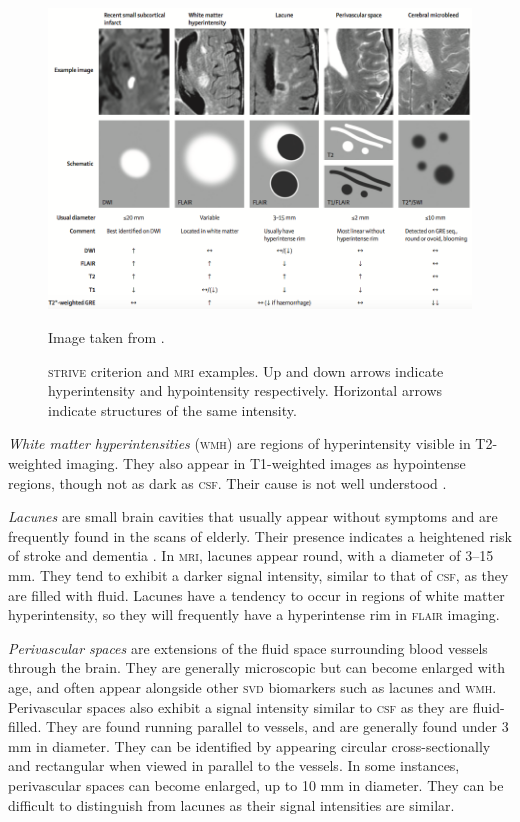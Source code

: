 \begin{figure}[ht]
	\centering
	\includegraphics[width = \textwidth]{Images/2_STRIVE.png}
	\caption{\textsc{strive} criterion and \textsc{mri} examples. Up and down arrows indicate hyperintensity and hypointensity respectively. Horizontal arrows indicate structures of the same intensity.}
	\small Image taken from \cite{WardlawJ.M.2013Nsfr}.
	\label{svd-biomarkers-fig}
\end{figure}

\textit{White matter hyperintensities} (\textsc{wmh}) are regions of hyperintensity visible in T2-weighted imaging. They also appear in T1-weighted images as hypointense regions, though not as dark as \textsc{csf}. Their cause is not well understood \citep{Gouw2011}.

\textit{Lacunes} are small brain cavities that usually appear without symptoms and are frequently found in the scans of elderly. Their presence indicates a heightened risk of stroke and dementia \citep{BenjaminJ.Philip2018LIbN, VanDerFlierM.Wiesje2005SVDa}. In \textsc{mri}, lacunes appear round, with a diameter of 3--15 mm. They tend to exhibit a darker signal intensity, similar to that of \textsc{csf}, as they are filled with fluid. Lacunes have a tendency to occur in regions of white matter hyperintensity, so they will frequently have a hyperintense rim in \textsc{flair} imaging.

\textit{Perivascular spaces} are extensions of the fluid space surrounding blood vessels through the brain. They are generally microscopic but can become enlarged with age, and often appear alongside other \textsc{svd} biomarkers such as lacunes and \textsc{wmh}. Perivascular spaces also exhibit a signal intensity similar to \textsc{csf} as they are fluid-filled. They are found running parallel to vessels, and are generally found under 3 mm in diameter. They can be identified by appearing circular cross-sectionally and rectangular when viewed in parallel to the vessels. In some instances, perivascular spaces can become enlarged, up to 10 mm in diameter. They can be difficult to distinguish from lacunes as their signal intensities are similar.


